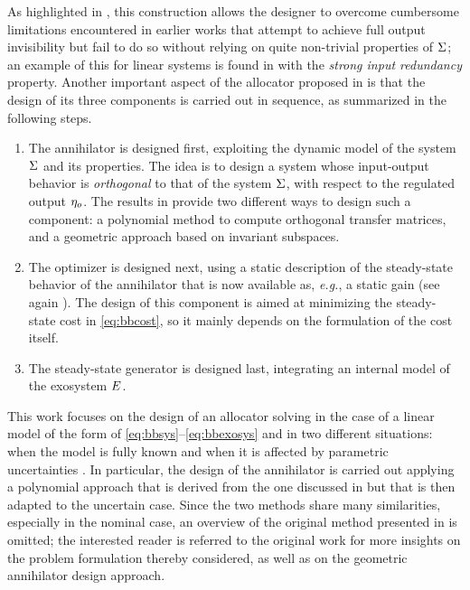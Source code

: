 As highlighted in \cite[Remark 4]{cristofaro_output_2014}, this construction allows the designer to overcome cumbersome limitations encountered in earlier works that attempt to achieve full output invisibility but fail to do so without relying on quite non-trivial properties of $\Sigma$; an example of this for linear systems is found in \cite{zaccarian_dynamic_2009} with the \emph{strong input redundancy} property. Another important aspect of the allocator proposed in \cite{cristofaro_output_2014} is that the design of its three components is carried out in sequence, as summarized in the following steps.
\begin{enumerate}
  \item The annihilator is designed first, exploiting the dynamic model of the system $\Sigma$ and its properties. The idea is to design a system whose input-output behavior is \emph{orthogonal} to that of the system $\Sigma$, with respect to the regulated output $\eta_o$. The results in \cite{cristofaro_output_2014} provide two different ways to design such a component: a polynomial method to compute orthogonal transfer matrices, and a geometric approach based on invariant subspaces.
  \item The optimizer is designed next, using a static description of the steady-state behavior of the annihilator that is now available as, \emph{e.g.}, a static gain (see again \cite{astolfi_model_2010,scarciotti_data-driven_2017}). The design of this component is aimed at minimizing the steady-state cost in \eqref{eq:bbcost}, so it mainly depends on the formulation of the cost itself.
  \item The steady-state generator is designed last, integrating an internal model of the exosystem $E$.
\end{enumerate}

This work focuses on the design of an allocator solving  in the case of a linear model of the form of \eqref{eq:bbsys}--\eqref{eq:bbexosys} and in two different situations: when the model is fully known and when it is affected by parametric uncertainties \cite{galeani_data-driven_2025}. In particular, the design of the annihilator is carried out applying a polynomial approach that is derived from the one discussed in \cite{cristofaro_output_2014} but that is then adapted to the uncertain case. Since the two methods share many similarities, especially in the nominal case, an overview of the original method presented in \cite{cristofaro_output_2014} is omitted; the interested reader is referred to the original work for more insights on the problem formulation thereby considered, as well as on the geometric annihilator design approach.

